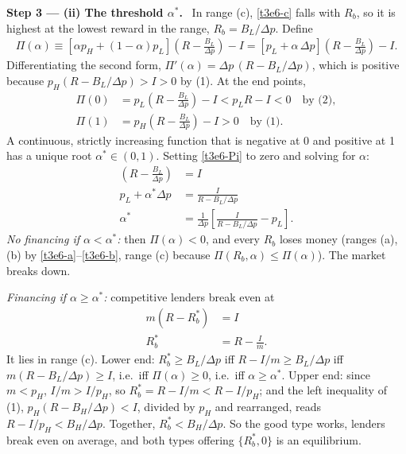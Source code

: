 \documentclass[11pt,a4paper]{article}
\newcommand{\step}[2]{\par\medskip\noindent\textbf{Step #1 --- #2.}~}
\begin{document}
\step{3}{(ii) The threshold $\alpha^*$} In range (c), \eqref{t3e6-c} falls with $R_b$, so it is highest at the lowest reward in the range, $R_b=B_L/\Delta p$. Define
\begin{align}
  \Pi(\alpha) \equiv [\alpha p_H+(1-\alpha)p_L]\left(R-\frac{B_L}{\Delta p}\right) - I
   = [p_L+\alpha\,\Delta p]\left(R-\frac{B_L}{\Delta p}\right) - I. \label{t3e6-Pi}
\end{align}
Differentiating the second form, $\Pi'(\alpha)=\Delta p\,(R-B_L/\Delta p)$, which is positive because $p_H(R-B_L/\Delta p)>I>0$ by (1). At the end points,
\begin{align}
  \Pi(0) &= p_L\left(R-\frac{B_L}{\Delta p}\right)-I < p_LR-I < 0 \quad\text{by (2)}, \nonumber\\
  \Pi(1) &= p_H\left(R-\frac{B_L}{\Delta p}\right)-I > 0 \quad\text{by (1)}. \nonumber
\end{align}
A continuous, strictly increasing function that is negative at 0 and positive at 1 has a unique root $\alpha^*\in(0,1)$. Setting \eqref{t3e6-Pi} to zero and solving for $\alpha$:
\begin{align}
  [p_L+\alpha^*\Delta p]\left(R-\frac{B_L}{\Delta p}\right) &= I \nonumber\\
  p_L+\alpha^*\Delta p &= \frac{I}{R-B_L/\Delta p} \nonumber\\
  \alpha^* &= \frac{1}{\Delta p}\left[\frac{I}{R-B_L/\Delta p}-p_L\right]. \label{t3e6-astar}
\end{align}
\textit{No financing if $\alpha<\alpha^*$:} then $\Pi(\alpha)<0$, and every $R_b$ loses money (ranges (a), (b) by \eqref{t3e6-a}--\eqref{t3e6-b}, range (c) because $\Pi(R_b,\alpha)\le\Pi(\alpha)$). The market breaks down.

\textit{Financing if $\alpha\ge\alpha^*$:} competitive lenders break even at
\begin{align}
  m(R-R_b^*) &= I \nonumber\\
  R_b^* &= R-\frac{I}{m}. \label{t3e6-Rbstar}
\end{align}
It lies in range (c). Lower end: $R_b^*\ge B_L/\Delta p$ iff $R-I/m\ge B_L/\Delta p$ iff $m(R-B_L/\Delta p)\ge I$, i.e.\ iff $\Pi(\alpha)\ge0$, i.e.\ iff $\alpha\ge\alpha^*$. Upper end: since $m<p_H$, $I/m>I/p_H$, so $R_b^*=R-I/m<R-I/p_H$; and the left inequality of (1), $p_H(R-B_H/\Delta p)<I$, divided by $p_H$ and rearranged, reads $R-I/p_H<B_H/\Delta p$. Together, $R_b^*<B_H/\Delta p$. So the good type works, lenders break even on average, and both types offering $\{R_b^*,0\}$ is an equilibrium.
\end{document}
